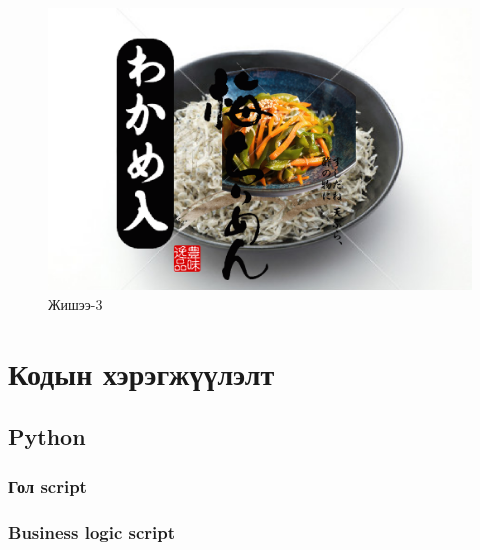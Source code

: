 \begin{figure}
	\centering
	\includegraphics[scale=2]{src/pictures/zurag3.png}
	\caption{Жишээ-3}
\end{figure}

\chapter{Кодын хэрэгжүүлэлт}
\section{Python}
\subsection{Гол script}

\subsection{Business logic script}



